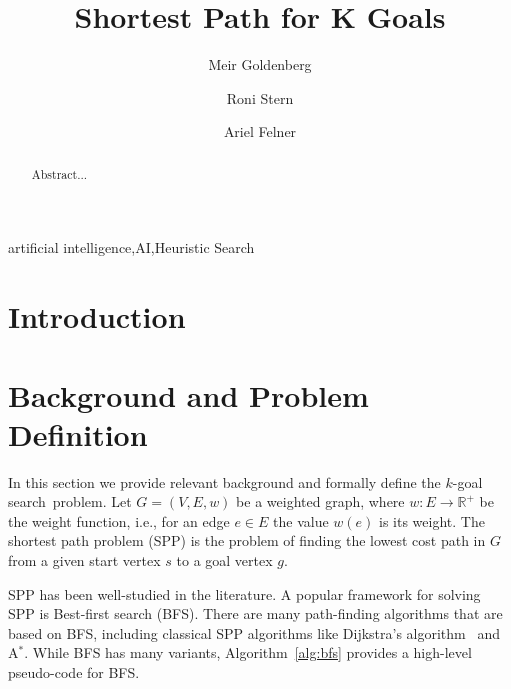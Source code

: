 \documentclass{aicom2e}
\newcommand{\kgs}{$k$-goal search}
\newcommand{\astar}{A$^*$}
\begin{document}
\begin{frontmatter}                           %
%
\title{Shortest Path for K Goals}
\maketitle
%
\author[]{Meir Goldenberg}
\address{Lev Academic Center\\ Jerusalem, Israel\\
	E-mail: mgoldenbe@gmail.com}
\author[]{Roni Stern}
\address{Ben Gurion University of the Negev\\ Be'er Sheva, Israel\\
E-mail: roni.stern@gmail.com}
\author[]{Ariel Felner}
\address{Ben Gurion University of the Negev\\ Be'er Sheva, Israel\\
	E-mail: felner@bgu.ac.il}

\begin{abstract}
Abstract...

\end{abstract}

\begin{keyword}
artificial intelligence\sep AI\sep Heuristic Search
\end{keyword}
%
\end{frontmatter}

\section*{Introduction}


\section{Background and Problem Definition}

In this section we provide relevant background and formally define the \kgs\ problem. 
Let $G=(V,E,w)$ be a weighted graph, where $w:E\rightarrow \mathbb{R}^+$ be the weight function, i.e., for an edge $e\in E$ the value $w(e)$ is its weight. 
The shortest path problem (SPP) is the problem of finding the lowest cost path in $G$ from a given start vertex $s$ to a goal vertex $g$. 

SPP has been well-studied in the literature. A popular framework for solving SPP is Best-first search (BFS). There are many path-finding algorithms that are based on BFS, including classical SPP algorithms like Dijkstra's algorithm~\cite{} and \astar{}. 
    While BFS has many variants, Algorithm~\ref{alg:bfs} provides a high-level pseudo-code for BFS. 
\end{document}
